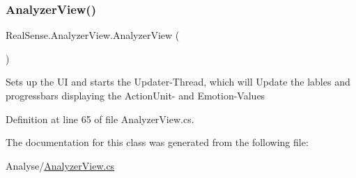\subsubsection{\texorpdfstring{Analyzer\+View()}{AnalyzerView()}}
{\footnotesize\ttfamily Real\+Sense.\+Analyzer\+View.\+Analyzer\+View (\begin{DoxyParamCaption}{ }\end{DoxyParamCaption})}

Sets up the UI and starts the Updater-\/\+Thread, which will Update the lables and progressbars displaying the Action\+Unit-\/ and Emotion-\/\+Values 

Definition at line 65 of file Analyzer\+View.\+cs.



The documentation for this class was generated from the following file\+:\begin{DoxyCompactItemize}
\item 
Analyse/\hyperlink{_analyzer_view_8cs}{Analyzer\+View.\+cs}\end{DoxyCompactItemize}
